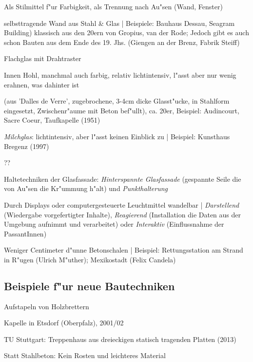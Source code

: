 \documentclass[emulatestandardclasses]{scrartcl}
\begin{document}
\begin{description}[leftmargin=!,labelwidth=\widthof{\bfseries Transluzentes G.}]
  \item[Glas] Als Stilmittel f"ur Farbigkeit, als Trennung nach Au"sen (Wand, Fenster)
  \item[Curtain Wall] selbsttragende Wand aus Stahl \& Glas | Beispiele: Bauhaus Dessau, Seagram Building) klassisch aus den 20ern von Gropius, van der Rode; Jedoch gibt es auch schon Bauten aus dem Ende des 19. Jhs. (Giengen an der Brenz, Fabrik Steiff)
  \item[Drahtglas] Flachglas mit Drahtraster
  \item[Glasbausteine] Innen Hohl, manchmal auch farbig, relativ lichtintensiv, l"asst aber nur wenig erahnen, was dahinter ist
  \item[Betonglas](aus 'Dalles de Verre', zugebrochene, 3-4cm dicke Glasst"ucke, in Stahlform eingesetzt, Zwischenr"aume mit Beton bef"ullt), ca. 20er, Beispiel: Audincourt, Sacre Coeur, Taufkapelle (1951) 
  \item[Opakes Glas] \emph{Milchglas}: lichtintensiv, aber l"asst keinen Einblick zu |  Beispiel: Kunsthaus Bregenz (1997)
  \item[Transluzentes G.] ??
  \item[Glasfassade] Haltetechniken der Glasfassade: \emph{Hinterspannte Glasfassade} (gespannte Seile die von Au"sen die Kr"ummung h"alt) und \emph{Punkthalterung}
  \item[Medienfassade] Durch Displays oder computergesteuerte Leuchtmittel wandelbar | \emph{Darstellend} (Wiedergabe vorgefertigter Inhalte), \emph{Reagierend} (Installation die Daten aus der Umgebung aufnimmt und verarbeitet) oder \emph{Interaktiv} (Einflussnahme der PassantInnen)
  \item[Betonschalen-Konstruktionen] Weniger Centimeter d"unne Betonschalen | Beispiel: Rettungsstation am Strand in R"ugen (Ulrich M"uther); Mexikostadt (Felix Candela)
\end{description}

\subsection{Beispiele f"ur neue Bautechniken}

\begin{description}[leftmargin=!,labelwidth=\widthof{\bfseries Blockbauweisei}]
  \item[Blockbauweise] Aufstapeln von Holzbrettern
  \item[Asphalt] Kapelle in Etsdorf (Oberpfalz), 2001/02
  \item[Biokunststoff] TU Stuttgart: Treppenhaus aus dreieckigen statisch tragenden Platten (2013)
  \item[Carbonbeton] Statt Stahlbeton: Kein Rosten und leichteres Material
\end{description}
\end{document}
